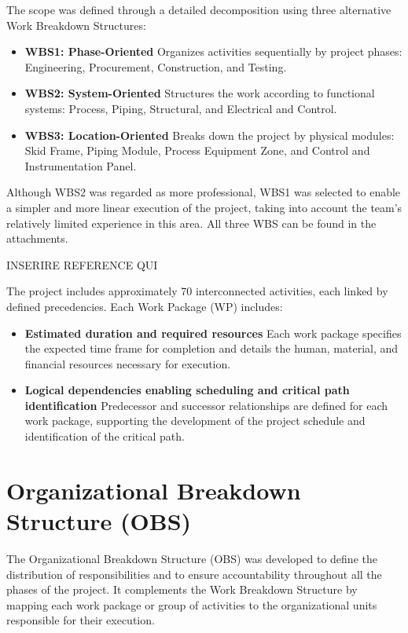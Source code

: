 The scope was defined through a detailed decomposition using three alternative Work Breakdown Structures:
\begin{itemize}
    \item \textbf{WBS1: Phase-Oriented}
          Organizes activities sequentially by project phases: Engineering, Procurement, Construction, and Testing.
    \item \textbf{WBS2: System-Oriented}
          Structures the work according to functional systems: Process, Piping, Structural, and Electrical and Control.
    \item \textbf{WBS3: Location-Oriented}
          Breaks down the project by physical modules: Skid Frame, Piping Module, Process Equipment Zone, and Control and Instrumentation Panel.
\end{itemize}
Although WBS2 was regarded as more professional, WBS1 was selected to enable a simpler and more linear execution of the project, taking into account the team’s relatively limited experience in this area.
All three WBS can be found in the attachments.

INSERIRE REFERENCE QUI

The project includes approximately 70 interconnected activities, each linked by defined precedencies.
Each Work Package (WP) includes:
\begin{itemize}
    \item \textbf{Estimated duration and required resources}
          Each work package specifies the expected time frame for completion and details the human, material, and financial resources necessary for execution.
    \item \textbf{Logical dependencies enabling scheduling and critical path identification}
          Predecessor and successor relationships are defined for each work package, supporting the development of the project schedule and identification of the critical path.
\end{itemize}

\section{Organizational Breakdown Structure (OBS)}

The Organizational Breakdown Structure (OBS) was developed to define the distribution of responsibilities and to ensure accountability throughout all the phases of the project. It complements the Work Breakdown Structure by mapping each work package or group of activities to the organizational units responsible for their execution.

